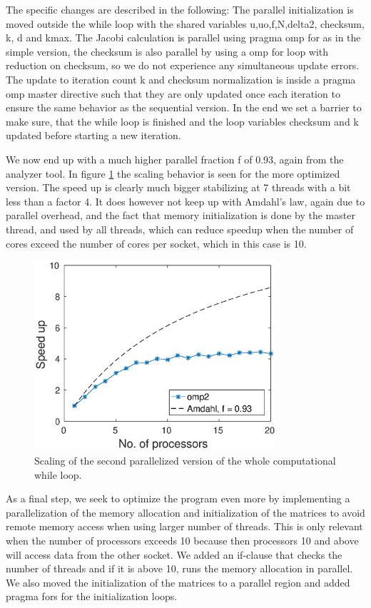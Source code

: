 The specific changes are described in the following: The parallel initialization is moved outside the while loop with the shared variables u,uo,f,N,delta2, checksum, k, d and kmax. The Jacobi calculation is parallel using pragma omp for as in the simple version, the checksum is also parallel by using a omp for loop with reduction on checksum, so we do not experience any simultaneous update errors. The update to iteration count k and checksum normalization is inside a pragma omp master directive such that they are only updated once each iteration to ensure the same behavior as the sequential version. In the end we set a barrier to make sure, that the while loop is finished and the loop variables checksum and k updated before starting a new iteration.


We now end up with a much higher parallel fraction f of 0.93, again from the analyzer tool. In figure \ref{fig:omp2_scale} the scaling behavior is seen for the more optimized version. The speed up is clearly much bigger stabilizing at 7 threads with a bit less than a factor 4. It does however not keep up with Amdahl's law, again due to parallel overhead, and the fact that memory initialization is done by the master thread, and used by all threads, which can reduce speedup when the number of cores exceed the number of cores per socket, which in this case is 10.

\begin{figure}[h!]
\centering
\includegraphics[width = 0.8\textwidth]{fig/speedup_omp2.eps}
\caption{Scaling of the second parallelized version of the whole computational while loop.}
\label{fig:omp2_scale}
\end{figure}

As a final step, we seek to optimize the program even more by implementing a parallelization of the memory allocation and initialization of the matrices to avoid remote memory access when using larger number of threads. This is only relevant when the number of processors exceeds 10 because then processors 10 and above will access data from the other socket. 
We added an if-clause that checks the number of threads and if it is above 10, runs the memory allocation in parallel. We also moved the initialization of the matrices to a parallel region and added pragma fors for the initialization loops.

